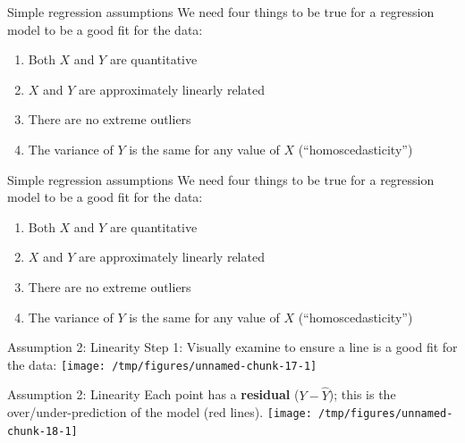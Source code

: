 \documentclass{beamer}\usepackage[]{graphicx}\usepackage[]{color}
\newenvironment{knitrout}{}{} %
\begin{document}
\begin{darkframes}
    \begin{frame}{Simple regression assumptions}
      We need four things to be true for a regression model to be a good fit for the data:
      \begin{enumerate}
        \item Both $X$ and $Y$ are quantitative
        \item $X$ and $Y$ are approximately linearly related
        \item There are no extreme outliers
        \item The variance of $Y$ is the same for any value of $X$ (``homoscedasticity'')
      \end{enumerate}
    \end{frame}

    \begin{frame}{Simple regression assumptions}
      We need four things to be true for a regression model to be a good fit for the data:
      \begin{enumerate}
        \item Both $X$ and $Y$ are quantitative \greencheckmark
        \item $X$ and $Y$ are approximately linearly related
        \item There are no extreme outliers
        \item The variance of $Y$ is the same for any value of $X$ (``homoscedasticity'')
      \end{enumerate}
    \end{frame}

    \begin{frame}{Assumption 2: Linearity}
      Step 1: Visually examine to ensure a line is a good fit for the data:
\begin{knitrout}
\color{fgcolor}
\texttt{[image: /tmp/figures/unnamed-chunk-17-1]} 

\end{knitrout}
    \end{frame}

    \begin{frame}{Assumption 2: Linearity}
      Each point has a \textbf{residual} ($Y-\hat Y$); this is the over/under-prediction of the model (red lines).
\begin{knitrout}
\color{fgcolor}
\texttt{[image: /tmp/figures/unnamed-chunk-18-1]} 

\end{knitrout}
    \end{frame}


\end{darkframes}
\end{document}
